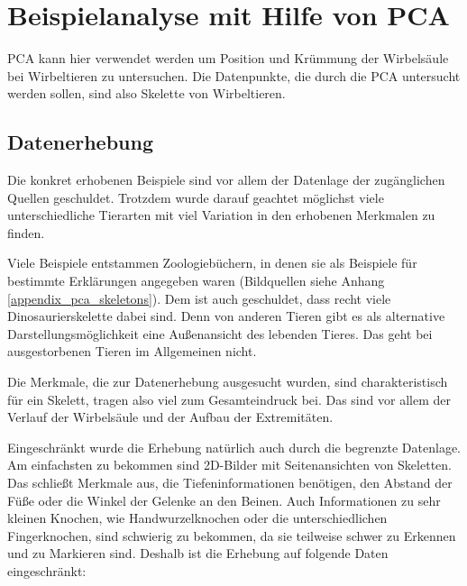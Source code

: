 \chapter{Beispielanalyse mit Hilfe von PCA}
\label{chapter:pca}
 
 PCA kann hier verwendet werden um Position und Krümmung der Wirbelsäule bei Wirbeltieren zu untersuchen. Die Datenpunkte, die durch die PCA untersucht werden sollen, sind also Skelette von Wirbeltieren.
 
 
 \section{Datenerhebung}
 
 Die konkret erhobenen Beispiele sind vor allem der Datenlage \bzw der zugänglichen Quellen geschuldet. Trotzdem wurde darauf geachtet möglichst viele unterschiedliche Tierarten mit viel Variation in den erhobenen Merkmalen zu finden.
 
 Viele Beispiele entstammen Zoologiebüchern, in denen sie als Beispiele für bestimmte Erklärungen angegeben waren (Bildquellen siehe Anhang \ref{appendix_pca_skeletons}). Dem ist auch geschuldet, dass recht viele Dinosaurierskelette dabei sind. Denn von anderen Tieren gibt es als alternative Darstellungsmöglichkeit eine Außenansicht des lebenden Tieres. Das geht bei ausgestorbenen Tieren im Allgemeinen nicht.
 
 Die Merkmale, die zur Datenerhebung ausgesucht wurden, sind charakteristisch für ein Skelett, tragen also viel zum Gesamteindruck bei. Das sind vor allem der Verlauf der Wirbelsäule und der Aufbau der Extremitäten.

 Eingeschränkt wurde die Erhebung natürlich auch durch die begrenzte Datenlage. Am einfachsten zu bekommen sind 2D-Bilder mit Seitenansichten von Skeletten. Das schließt Merkmale aus, die Tiefeninformationen benötigen, \zb den Abstand der Füße oder die Winkel der Gelenke an den Beinen. Auch Informationen zu sehr kleinen Knochen, wie Handwurzelknochen oder die unterschiedlichen Fingerknochen, sind schwierig zu bekommen, da sie teilweise schwer zu Erkennen und zu Markieren sind. 
 Deshalb ist die Erhebung auf folgende Daten eingeschränkt:
  
